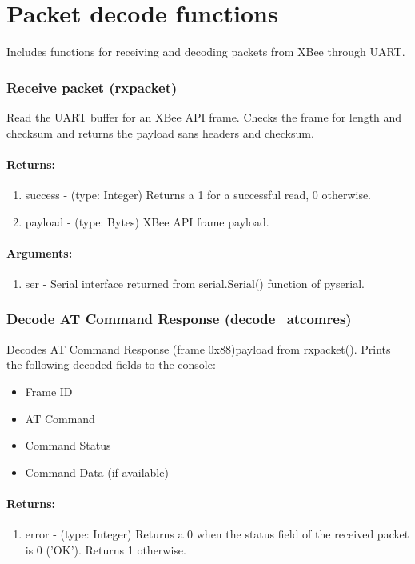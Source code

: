 \part{Packet decode functions}
Includes functions for receiving and decoding packets from XBee through UART.

\section{Receive packet (rxpacket)}
Read the UART buffer for an XBee API frame. Checks the frame for length and checksum and returns the payload sans headers and checksum.
\subsection{Returns:}
\begin{enumerate}
\item success - (type: Integer) Returns a 1 for a successful read, 0 otherwise.
\item payload - (type: Bytes) XBee API frame payload.
\end{enumerate}
\subsection{Arguments:}
\begin{enumerate}
\item ser - Serial interface returned from serial.Serial() function of pyserial.
\end{enumerate}

\section{Decode AT Command Response (decode\_atcomres)}
Decodes AT Command Response (frame 0x88)payload from rxpacket(). Prints the following decoded fields to the console:
\begin{itemize}
\item Frame ID
\item AT Command
\item Command Status
\item Command Data (if available)
\end{itemize}
\subsection{Returns:}
\begin{enumerate}
\item error - (type: Integer) Returns a 0 when the status field of the received packet is 0 ('OK'). Returns 1 otherwise.
\end{enumerate}
